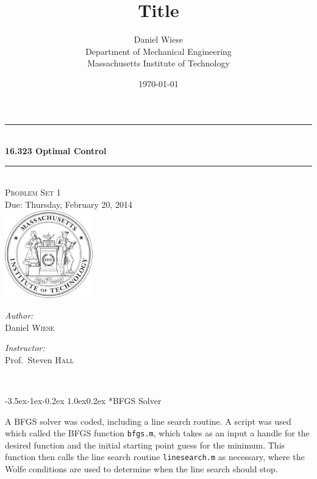 \documentclass[11pt,letterpaper,onecolumn,notitlepage]{article}
\title{\textbf{Title}}
\author{Daniel Wiese \\ Department of Mechanical Engineering \\ Massachusetts Institute of Technology}
\date{\today}
\makeatletter
\renewcommand\section{\@startsection{section}{1}{\z@}%
{-3.5ex\@plus-1ex\@minus-0.2ex}%
{1.0ex\@plus0.2ex}%
{\fontsize{12pt}{12pt}\selectfont\bfseries\sffamily}}
\makeatother
\begin{document}
\begin{titlepage}
  \begin{center}
    \rule{\linewidth}{0.01in} \\[0.25in]
    {\huge\bfseries 16.323 Optimal Control} \\[0.4cm]
    \rule{\linewidth}{0.01in} \\[0.25in]

    \textsc{\LARGE Problem Set 1} \\[0.15in]
    \large Due: Thursday, February 20, 2014 \\[1.0in]
    \includegraphics[width=1.5in]{../fig/mit-seal.pdf} \\[3.0in]

    \begin{minipage}{0.4\textwidth}
      \begin{flushleft} \large
        \emph{Author:}\\
        Daniel \textsc{Wiese}
        \vfill
      \end{flushleft}
    \end{minipage}
    \begin{minipage}{0.4\textwidth}
      \begin{flushright} \large
        \emph{Instructor:} \\
        Prof.~Steven \textsc{Hall} \\
      \end{flushright}
    \end{minipage} \\
    \vfill
  \end{center}
\end{titlepage}

\clearpage
\section*{BFGS Solver}

A BFGS solver was coded, including a line search routine.
A script was used which called the BFGS function \texttt{bfgs.m}, which takes as an input a handle for the desired function and the initial starting point guess for the minimum.
This function then calls the line search routine \texttt{linesearch.m} as necessary, where the Wolfe conditions are used to determine when the line search should stop.
\end{document}
